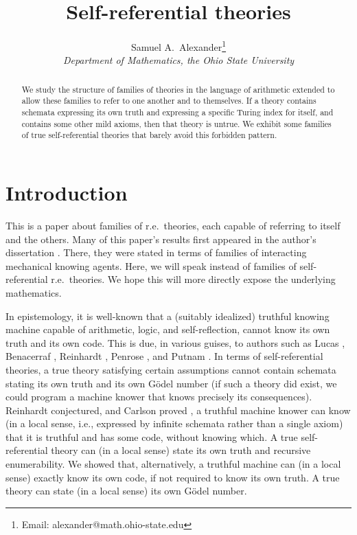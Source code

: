 \documentclass[reqno]{article}
\theoremstyle{definition}
\begin{document}
\title{Self-referential theories}
\author{Samuel A.~Alexander\thanks{Email:
alexander@math.ohio-state.edu}\\
\emph{Department of Mathematics, the Ohio State University}}

\maketitle

\begin{abstract}
We study the structure of families of theories in the language
of arithmetic extended to allow these families to refer to
one another and to themselves.
If a theory contains schemata expressing its own truth and
expressing a specific Turing index for itself,
and contains some other mild axioms, then that theory
is untrue. We exhibit some families of
true self-referential theories that barely avoid this forbidden
pattern.
\end{abstract}


\section{Introduction}

This is a paper about families of r.e.~theories, each capable of referring to
itself and the others.
Many of this paper's results first appeared in the author's dissertation 
\cite{alexanderdissert}.  There, they were stated in terms of families
of interacting mechanical knowing agents.  Here, we will
speak instead of families of self-referential r.e.~theories.  We hope this will
more directly expose the underlying mathematics.

In epistemology, it is well-known that a (suitably idealized) truthful knowing machine capable of
arithmetic, logic, and self-reflection, cannot know its own truth and its own code.
This is due, in various guises,
to authors such as
Lucas \cite{lucas},
Benacerraf \cite{benacerraf}, Reinhardt \cite{reinhardt}, Penrose \cite{penrose},
and Putnam \cite{putnam}.  In terms of self-referential
theories, a true theory satisfying certain assumptions cannot contain schemata stating
its own truth and its own G\"odel number
(if such a theory did exist, we could program a machine knower that knows precisely
its consequences).
Reinhardt conjectured, and Carlson proved \cite{carlson2000}, a truthful machine knower
can know (in a local sense, i.e., expressed by infinite schemata rather
than a single axiom) that it is truthful and has some code, without knowing which.
A true self-referential theory can (in a local sense) state its own truth and
recursive enumerability.  We showed \cite{alexandercode} that, alternatively, a truthful
machine can (in a local sense) exactly know its own code, if not required to know its own
truth.  A true theory can state (in a local sense) its own G\"odel number.
\end{document}
